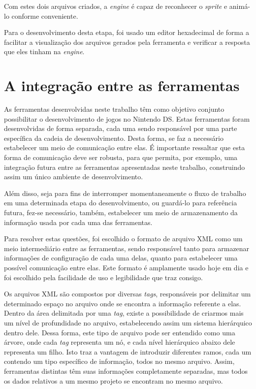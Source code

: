 \documentclass[brazil]{abnt}
\begin{document}
Com estes dois arquivos criados, a \textit{engine} é capaz de reconhecer o \textit{sprite} e animá-lo conforme conveniente. 



Para o desenvolvimento desta etapa, foi usado um editor hexadecimal de forma a facilitar a visualização dos arquivos gerados pela ferramenta e verificar a resposta que eles tinham na \textit{engine}.

\section{A integração entre as ferramentas\label{sec:xml}}

As ferramentas desenvolvidas neste trabalho têm como objetivo conjunto possibilitar o desenvolvimento de jogos no Nintendo DS. Estas ferramentas foram desenvolvidas de forma separada, cada uma sendo responsável por uma parte específica da cadeia de desenvolvimento. Desta forma, se faz a necessário estabelecer um meio de comunicação entre elas. É importante ressaltar que esta forma de comunicação deve ser robusta, para que permita, por exemplo, uma integração futura entre as ferramentas apresentadas neste trabalho, construindo assim um único ambiente de desenvolvimento. 

Além disso, seja para fins de interromper momentaneamente o fluxo de trabalho em uma determinada etapa do desenvolvimento, ou guardá-lo para referência futura, fez-se necessário, também, estabelecer um meio de armazenamento da informação usada por cada uma das ferramentas.

Para resolver estas questões, foi escolhido o formato de arquivo XML como um meio intermediário entre as ferramentas, sendo responsável tanto para armazenar informações de configuração de cada uma delas, quanto para estabelecer uma possível comunicação entre elas. Este formato é amplamente usado hoje em dia e foi escolhido pela facilidade de uso e legibilidade que traz consigo. 

Os arquivos XML são compostos por diversas \textit{tags}, responsáveis por delimitar um determinado espaço no arquivo onde se encontra a informação referente a elas. Dentro da área delimitada por uma \textit{tag}, existe a possibilidade de criarmos mais um nível de profundidade no arquivo, estabelecendo assim um sistema hierárquico dentro dele. Dessa forma, este tipo de arquivo pode ser entendido como uma árvore, onde cada \textit{tag} representa um nó, e cada nível hierárquico abaixo dele representa um filho. Isto traz a vantagem de introduzir diferentes ramos, cada um contendo um tipo específico de informação, todos no mesmo arquivo. Assim, ferramentas distintas têm suas informações completamente separadas, mas todos os dados relativos a um mesmo projeto se encontram no mesmo arquivo. 
\end{document}
